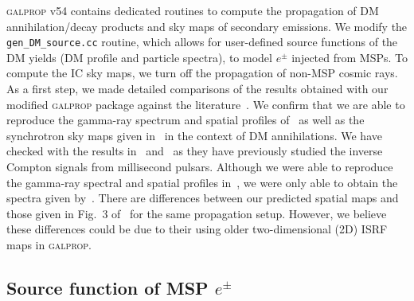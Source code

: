 \documentclass[doublespace,nopageskip]{VTthesis}
\begin{document}
\textsc{galprop} v54 contains dedicated routines to compute the propagation of DM annihilation/decay products and sky maps of secondary emissions. We modify the \texttt{gen\_DM\_source.cc} routine, which allows for user-defined source functions of the DM yields (DM profile and particle spectra), to model  $e^\pm$ injected from MSPs. To compute the IC sky maps, we turn off the propagation of non-MSP cosmic rays. As a first step, we made detailed comparisons of the results obtained with our modified \textsc{galprop} package against the literature~\cite{2014JCAP...12..045C,2016JCAP...07..041C,2015ApJ...802..124Y,2015JCAP...02..023P}. We confirm that we are able to reproduce the gamma-ray spectrum and spatial profiles of~\citet{2014JCAP...12..045C} as well as the synchrotron sky maps given in~\citet{2016JCAP...07..041C} in the context of DM annihilations. 
{We have checked with the results in~\citet{2015ApJ...802..124Y} and~\citet{2015JCAP...02..023P} as they have previously studied the inverse Compton signals from millisecond pulsars.}
Although we were able to reproduce the gamma-ray spectral and spatial profiles in~\citet{2015JCAP...02..023P}, we were only able to obtain the spectra given by~\citet{2015ApJ...802..124Y}. There are differences between our predicted spatial maps and those given in Fig.~3 of~\citet{2015ApJ...802..124Y} for the same propagation setup. However, we believe these differences could be due to their using older two-dimensional (2D) ISRF maps in \textsc{galprop}.

\subsection{Source function of MSP \texorpdfstring{$e^\pm$}{electrons/positrons}}\label{sec:source}

\end{document}
